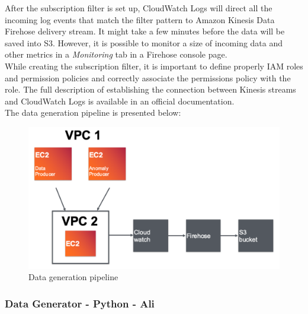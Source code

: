         \FloatBarrier    
        After the subscription filter is set up, CloudWatch Logs will direct all the incoming log events that match the filter pattern to Amazon Kinesis Data Firehose delivery stream. It might take a few minutes before the data will be saved into S3. However, it is possible to monitor a size of incoming data and other metrics in a \textit{Monitoring} tab in a Firehose console page. \\
        While creating the subscription filter, it is important to define properly IAM roles and permission policies and correctly associate the permissions policy with the role. The full description of establishing the connection between Kinesis streams and CloudWatch Logs is available in an official documentation.\\
        The data generation pipeline is presented below:
        \begin{figure}[h]
            \centering
            \includegraphics[width=1\textwidth]{images/data-generation-pipeline.png}
            \caption{Data generation pipeline}
            \label{fig:data_generation_pipeline}
        \end{figure}
        \FloatBarrier
        \subsubsection{Data Generator - Python - Ali }

